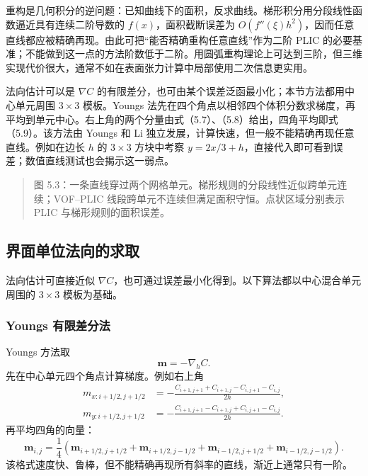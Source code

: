 \documentclass[11pt,a4paper,openany,fontset=none]{ctexbook}
\begin{document}
重构是几何积分的逆问题：已知曲线下的面积，反求曲线。梯形积分用分段线性函数逼近具有连续二阶导数的 $f(x)$，面积截断误差为 $O(f''(\xi)h^2)$，因而任意直线都应被精确再现。由此可把“能否精确重构任意直线”作为二阶 PLIC 的必要基准；不能做到这一点的方法阶数低于二阶。用圆弧重构理论上可达到三阶，但三维实现代价很大，通常不如在表面张力计算中局部使用二次信息更实用。

法向估计可以是 $\nabla C$ 的有限差分，也可由某个误差泛函最小化；本节方法都用中心单元周围 $3\times3$ 模板。Youngs 法先在四个角点以相邻四个体积分数求梯度，再平均到单元中心。右上角的两个分量由式（5.7）、（5.8）给出，四角平均即式（5.9）。该方法由 Youngs 和 Li 独立发展，计算快速，但一般不能精确再现任意直线。例如在边长 $h$ 的 $3\times3$ 方块中考察 $y=2x/3+h$，直接代入即可看到误差；数值直线测试也会揭示这一弱点。

\begin{quote}\small 图 5.3：一条直线穿过两个网格单元。梯形规则的分段线性近似跨单元连续；VOF--PLIC 线段跨单元不连续但满足面积守恒。点状区域分别表示 PLIC 与梯形规则的面积误差。\end{quote}
\subsection{界面单位法向的求取}

法向估计可直接近似 $\nabla C$，也可通过误差最小化得到。以下算法都以中心混合单元周围的 $3\times3$ 模板为基础。

\subsubsection{Youngs 有限差分法}

Youngs 方法取
\begin{equation}
\bm m=-\nabla_h C.
\tag{5.6}
\end{equation}
先在中心单元四个角点计算梯度。例如右上角
\begin{align}
m_{x:i+1/2,j+1/2}&=-\frac{C_{i+1,j+1}+C_{i+1,j}-C_{i,j+1}-C_{i,j}}{2h},
\tag{5.7}\\
m_{y:i+1/2,j+1/2}&=-\frac{C_{i+1,j+1}-C_{i+1,j}+C_{i,j+1}-C_{i,j}}{2h}.
\tag{5.8}
\end{align}
再平均四角的向量：
\begin{equation}
\bm m_{i,j}=\frac14(\bm m_{i+1/2,j+1/2}+\bm m_{i+1/2,j-1/2}
+\bm m_{i-1/2,j+1/2}+\bm m_{i-1/2,j-1/2}).
\tag{5.9}
\end{equation}
该格式速度快、鲁棒，但不能精确再现所有斜率的直线，渐近上通常只有一阶。
\end{document}
